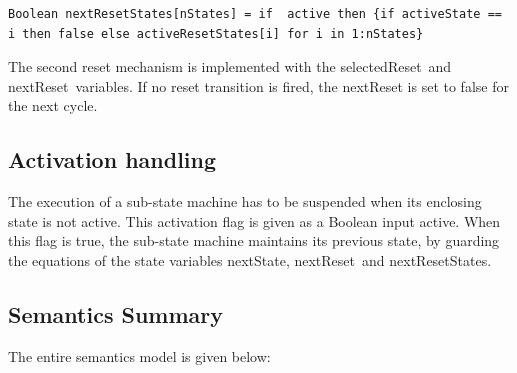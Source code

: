 \documentclass[10pt,a4paper]{report}
\def\doublelabel#1{\label{#1}\hypertarget{#1}{}}
\begin{document}
\begin{lstlisting}[language=modelica]
  Boolean nextResetStates[nStates] = if  active then {if activeState == i then false else activeResetStates[i] for i in 1:nStates}
\end{lstlisting}
The second reset mechanism is implemented with the selectedReset~and
nextReset~variables. If no reset transition is fired, the nextReset is
set to false for the next cycle.

\subsection{Activation handling}\doublelabel{activation-handling}

The execution of a sub-state machine has to be suspended when its
enclosing state is not active. This activation flag is given as a
Boolean input active. When this flag is true, the sub-state machine
maintains its previous state, by guarding the equations of the state
variables nextState, nextReset~and nextResetStates.

\subsection{Semantics Summary}\doublelabel{semantics-summary}

The entire semantics model is given below:
\end{document}
